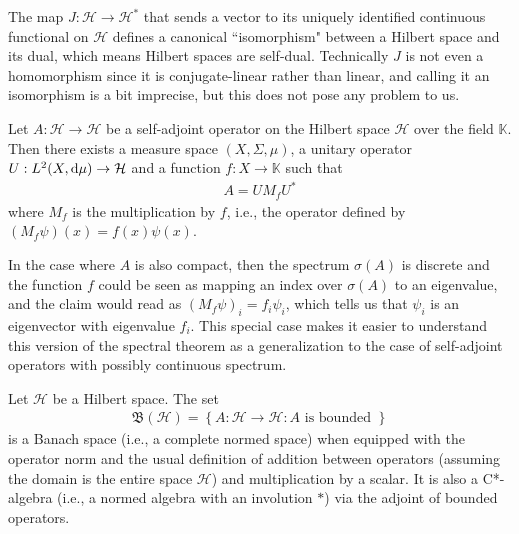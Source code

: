 \begin{appendices}
\begin{remark}
	The map $J:\mathcal{H}\to\mathcal{H}^*$ that sends a vector to its uniquely identified
	continuous functional on $\mathcal{H}$ defines a canonical ``isomorphism" between a
	Hilbert space and its dual, which means Hilbert spaces are self-dual. Technically $J$ is
	not even a homomorphism since it is conjugate-linear rather than linear, and calling it an
	isomorphism is a bit imprecise, but this does not pose any problem to us.
\end{remark}

\begin{theorem}
	Let $A : \mathcal{H}\to\mathcal{H}$ be a self-adjoint operator on the Hilbert space
	$\mathcal{H}$ over the field $\mathbb{K}$. Then there exists a measure space
	$(X,\Sigma,\mu)$, a unitary operator $U:L^2(X,\mathrm{d}\mu)\to\mathcal{H}$ and a function
	$f:X\to\mathbb{K}$ such that
	\begin{align*}
		A = U M_f U^*
	\end{align*}
	where $M_f$ is the multiplication by $f$, i.e., the operator defined by
	$(M_f\psi)(x) = f(x)\psi(x)$.
\end{theorem}

\begin{remark}
	In the case where $A$ is also compact, then the spectrum $\sigma(A)$ is discrete and the
	function $f$ could be seen as mapping an index over $\sigma(A)$ to an eigenvalue, and the
	claim would read as $(M_f\psi)_i = f_i \psi_i$, which tells us that $\psi_i$ is an
	eigenvector with eigenvalue $f_i$. This special case makes it easier to understand this
	version of the spectral theorem as a generalization to the case of self-adjoint operators
	with possibly continuous spectrum.
\end{remark}

\begin{theorem}
	Let $\mathcal{H}$ be a Hilbert space. The set
	\begin{align*}
		\mathfrak{B}(\mathcal{H}) = \left\{ A:\mathcal{H}\to\mathcal{H} : A \text{ is bounded } \right\}
	\end{align*}
	is a Banach space (i.e., a complete normed space) when equipped with the operator norm and
	the usual definition of addition between operators (assuming the domain is the entire
	space $\mathcal{H}$) and multiplication by a scalar. It is also a C*-algebra (i.e., a
	normed algebra with an involution $*$) via the adjoint of bounded operators.
\end{theorem}


\end{appendices}
